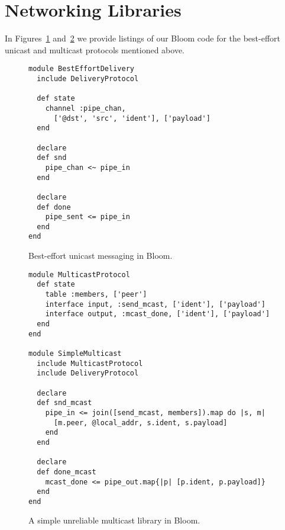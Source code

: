 \section{Networking Libraries}
In Figures~\ref{fig:delivery-impl} and~\ref{fig:multicast-impl} we provide listings of our Bloom code for the best-effort unicast and multicast protocols mentioned above.
\label{app:network-code}

\begin{figure}[h]
\begin{scriptsize}
\begin{lstlisting}
module BestEffortDelivery
  include DeliveryProtocol

  def state
    channel :pipe_chan,
      ['@dst', 'src', 'ident'], ['payload']
  end

  declare
  def snd
    pipe_chan <~ pipe_in
  end

  declare
  def done
    pipe_sent <= pipe_in
  end
end
\end{lstlisting}
\centering
\vspace{-10pt}
\caption{Best-effort unicast messaging in Bloom.}
\label{fig:delivery-impl}
\end{scriptsize}
\vspace{-2pt}
\end{figure}


\begin{figure}[h]
\begin{scriptsize}
\begin{lstlisting}
module MulticastProtocol
  def state
    table :members, ['peer']
    interface input, :send_mcast, ['ident'], ['payload']
    interface output, :mcast_done, ['ident'], ['payload']
  end
end

module SimpleMulticast
  include MulticastProtocol
  include DeliveryProtocol

  declare
  def snd_mcast
    pipe_in <= join([send_mcast, members]).map do |s, m|
      [m.peer, @local_addr, s.ident, s.payload]
    end
  end

  declare
  def done_mcast
    mcast_done <= pipe_out.map{|p| [p.ident, p.payload]}
  end
end
\end{lstlisting}
\centering
\vspace{-10pt}
\caption{A simple unreliable multicast library in Bloom.}
\label{fig:multicast-impl}
\end{scriptsize}
\vspace{-2pt}
\end{figure}

